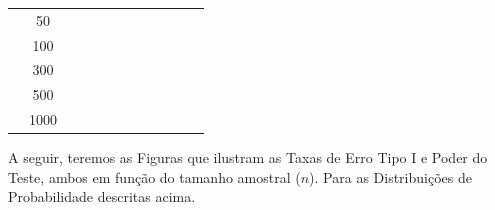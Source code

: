 \documentclass[a4paper,11pt]{article} %
\begin{document}
\begin{table}
\begin{tabular}{c|c|c|c|c|c|c|c|c|c|c|c}
                  &  50     &    &       &       &      &     &             &      &         &         &        \\
                  & 100     &    &       &       &      &     &             &      &         &         &        \\
                  & 300     &    &       &       &      &     &             &      &         &         &        \\
                  & 500     &    &       &       &      &     &             &      &         &         &        \\
                  & 1000    &    &       &       &      &     &             &      &         &         &        \\
    \hline \hline
    \end{tabular}
    \label{tab:inverted}
\end{table}
















A seguir, teremos as Figuras que ilustram as Taxas de Erro Tipo I e Poder do Teste, ambos em função do tamanho amostral ($n$). Para as Distribuições de Probabilidade descritas acima.
\end{document}
